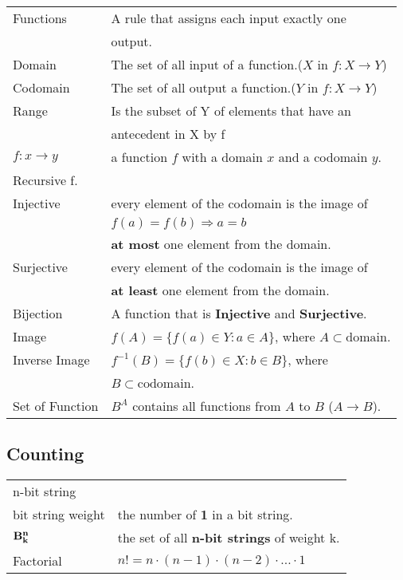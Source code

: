 \documentclass[5pt]{article}
\begin{document}
\begin{multicols}{2}
\begin{tabular}{ll}
    Functions           & A rule that assigns each input exactly one \\
                        & output.\\
    Domain              & The set of all input of a function.($X$ in $f:X\rightarrow Y$)\\
    Codomain            & The set of all output a function.($Y$ in $f:X\rightarrow Y$)\\
    Range               & Is the subset of Y of elements that have an\\
                        & antecedent in X by f\\
    $f:x\rightarrow y$  & a function $f$ with a domain $x$ and a codomain $y$.\\
    Recursive f.        & \\
    Injective           & every element of the codomain is the image  of \\
                        & $f(a)=f(b)\Rightarrow a=b$\\
                        & \textbf{at most} one element from the domain.\\
    Surjective          & every element of the codomain is the image  of \\
                        & \textbf{at least} one element from the domain.\\
    Bijection           & A function that is \textbf{Injective} and \textbf{Surjective}.\\
    Image               & $f(A)=\{f(a)\in Y: a\in A\}$, where $A\subset\text{domain}$.\\
    Inverse Image       & $f^{-1}(B)=\{f(b)\in X: b\in B\}$, where \\
                        & $B\subset\text{codomain}$.\\
    Set of Function     & $B^A$ contains all functions from $A$ to $B$ ($A\rightarrow B$).\\
\end{tabular}

\subsection{Counting}

\begin{tabular}{ll}
    n-bit string            & \\
    bit string weight       & the number of \textbf{1} in a bit string.\\
    $\bf{B}^n_k$            & the set of all \textbf{n-bit strings} of weight k.\\
    Factorial               & $n!=n\cdot(n-1)\cdot(n-2)\cdot...\cdot 1$\\
\end{tabular}


\end{multicols}
\end{document}
